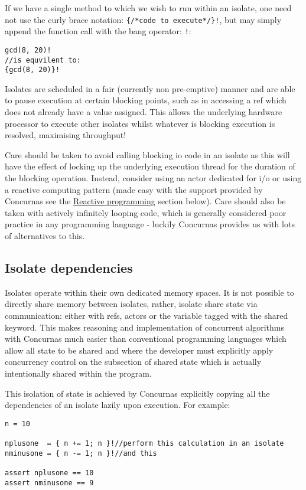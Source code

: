 \documentclass[conc-doc]{subfiles}
\begin{document}
If we have a single method to which we wish to run within an isolate, one need not use the curly brace notation: \lstinline!{/*code to execute*/}!\lstinline{!}, but may simply append the function call with the bang operator: \lstinline{!}:

\begin{lstlisting}
gcd(8, 20)!
//is equvilent to:
{gcd(8, 20)}!
\end{lstlisting}

Isolates are scheduled in a fair (currently non pre-emptive) manner and are able to pause execution at certain blocking points, such as in accessing a ref which does not already have a value assigned. This allows the underlying hardware processor to execute other isolates whilst whatever is blocking execution is resolved, maximising throughput!

Care should be taken to avoid calling blocking io code in an isolate as this will have the effect of locking up the underlying execution thread for the duration of the blocking operation. Instead, consider using an actor dedicated for i/o or using a reactive computing pattern (made easy with the support provided by Concurnas see the \hyperref[sec:reactive]{Reactive programming} section below). Care should also be taken with actively infinitely looping code, which is generally considered poor practice in any programming language - luckily Concurnas provides us with lots of alternatives to this.


\subsection{Isolate dependencies}
Isolates operate within their own dedicated memory spaces. It is not possible to directly share memory between isolates, rather, isolate share state via communication: either with refs, actors or the variable tagged with the shared keyword. This makes reasoning and implementation of concurrent algorithms with Concurnas much easier than conventional programming languages which allow all state to be shared and where the developer must explicitly apply concurrency control on the subsection of shared state which is actually intentionally shared within the program.

This isolation of state is achieved by Concurnas explicitly copying all the dependencies of an isolate lazily upon execution. For example:

\begin{lstlisting}
n = 10

nplusone  = { n += 1; n }!//perform this calculation in an isolate
nminusone = { n -= 1; n }!//and this

assert nplusone == 10
assert nminusone == 9
\end{lstlisting}
\end{document}
